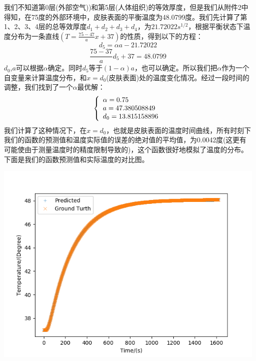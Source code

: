 \documentclass[bwprint]{cumcmthesis}
\begin{document}
    \indent 我们不知道第0层(外部空气))和第5层(人体组织)的等效厚度，但是我们从附件2中得知，在75度的外部环境中，皮肤表面的平衡温度为48.0799度。我们先计算了第1、2、3、4层的总等效厚度$d_1+d_2+d_3+d_4$，为$21.72022 s^{1/2}$，根据平衡状态下温度分布为一条直线$(T = \frac{75-47}{a}x+37)$的性质，得到以下的方程：
    \begin{equation}
        d_5 = \alpha a - 21.72022
    \end{equation}
    \begin{equation}
        \frac{75-37}{a}d_5 + 37 = 48.0799    
    \end{equation}
    \indent $d_0$,$a$可以根据$\alpha$确定。同时$d_5$等于$(1-\alpha)a$，也可以确定。所以我们把$\alpha$作为一个自变量来计算温度分布，和$x=d_0$(皮肤表面)处的温度变化情况。经过一段时间的调整，我们找到了一个$\alpha$最优解：
    \begin{equation}
        \centering
        \left\{  
     \begin{array}{lr}  
        \alpha=0.75 \\   
        a=47.380508849 \\
        d_0=13.815158896
     \end{array}  
    \right.
    \end{equation}
    \indent  我们计算了这种情况下，在$x=d_0$，也就是皮肤表面的温度时间曲线，所有时刻下我们的函数的预测值和温度实际值的误差的绝对值的平均值，为0.0042度(这更有可能使由于测量温度时的精度限制导致的)，这个函数很好地模拟了温度的分布。下面是我们的函数预测值和实际温度的对比图。
    \begin{flushleft}
        \includegraphics[scale = 1]{Problem1.png}
    \end{flushleft}
\end{document}
